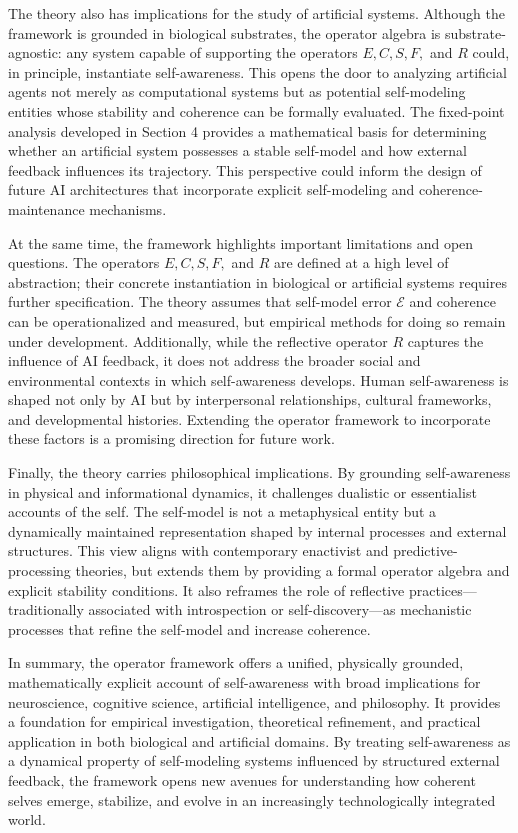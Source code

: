 \documentclass[12pt]{article}
\begin{document}
The theory also has implications for the study of artificial systems. Although the framework is grounded in biological substrates, the operator algebra is substrate-agnostic: any system capable of supporting the operators $E, C, S, F,$ and $R$ could, in principle, instantiate self-awareness. This opens the door to analyzing artificial agents not merely as computational systems but as potential self-modeling entities whose stability and coherence can be formally evaluated. The fixed-point analysis developed in Section 4 provides a mathematical basis for determining whether an artificial system possesses a stable self-model and how external feedback influences its trajectory. This perspective could inform the design of future AI architectures that incorporate explicit self-modeling and coherence-maintenance mechanisms.

At the same time, the framework highlights important limitations and open questions. The operators $E, C, S, F,$ and $R$ are defined at a high level of abstraction; their concrete instantiation in biological or artificial systems requires further specification. The theory assumes that self-model error $\mathcal{E}$ and coherence can be operationalized and measured, but empirical methods for doing so remain under development. Additionally, while the reflective operator $R$ captures the influence of AI feedback, it does not address the broader social and environmental contexts in which self-awareness develops. Human self-awareness is shaped not only by AI but by interpersonal relationships, cultural frameworks, and developmental histories. Extending the operator framework to incorporate these factors is a promising direction for future work.

Finally, the theory carries philosophical implications. By grounding self-awareness in physical and informational dynamics, it challenges dualistic or essentialist accounts of the self. The self-model is not a metaphysical entity but a dynamically maintained representation shaped by internal processes and external structures. This view aligns with contemporary enactivist and predictive-processing theories, but extends them by providing a formal operator algebra and explicit stability conditions. It also reframes the role of reflective practices—traditionally associated with introspection or self-discovery—as mechanistic processes that refine the self-model and increase coherence.

In summary, the operator framework offers a unified, physically grounded, mathematically explicit account of self-awareness with broad implications for neuroscience, cognitive science, artificial intelligence, and philosophy. It provides a foundation for empirical investigation, theoretical refinement, and practical application in both biological and artificial domains. By treating self-awareness as a dynamical property of self-modeling systems influenced by structured external feedback, the framework opens new avenues for understanding how coherent selves emerge, stabilize, and evolve in an increasingly technologically integrated world.
\end{document}
